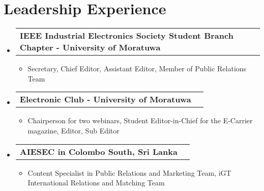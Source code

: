\documentclass[letterpaper,11pt]{article}
\makeatletter
\newcommand{\resumeItem}[1]{
  \item\small{
    {#1 \vspace{-2pt}}
  }
}
\newcommand{\resumeProjectHeading}[2]{
    \item
    \begin{tabular*}{0.97\textwidth}{l@{\extracolsep{\fill}}r}
      \small#1 & #2 \\
    \end{tabular*}\vspace{-7pt}
}
\newcommand{\resumeSubHeadingListStart}{\begin{itemize}[leftmargin=0.15in, label={}]}
\newcommand{\resumeSubHeadingListEnd}{\end{itemize}}
\newcommand{\resumeItemListStart}{\begin{itemize}}
\newcommand{\resumeItemListEnd}{\end{itemize}\vspace{-5pt}}
\makeatother
\begin{document}
\section{Leadership Experience}
    \resumeSubHeadingListStart
    \resumeProjectHeading
        {\textbf{\small{IEEE Industrial Electronics Society Student Branch Chapter - University of Moratuwa}}}{}
        \resumeItemListStart
            \resumeItem{\small{Secretary, Chief Editor, Assistant Editor, Member of Public Relations Team}}
        \resumeItemListEnd
    \resumeProjectHeading
        {\textbf{\small{Electronic Club - University of Moratuwa}}}{}
        \resumeItemListStart
            \resumeItem{\small{Chairperson for two webinars, Student Editor-in-Chief for the E-Carrier magazine, Editor, Sub Editor}}

        \resumeItemListEnd
    \resumeProjectHeading
        {\textbf{\small{AIESEC in Colombo South, Sri Lanka}}}{}
        \resumeItemListStart
            \resumeItem{\small{Content Specialist in Public Relations and Marketing Team, iGT International Relations and Matching Team}}
        \resumeItemListEnd
    \resumeSubHeadingListEnd
\end{document}
